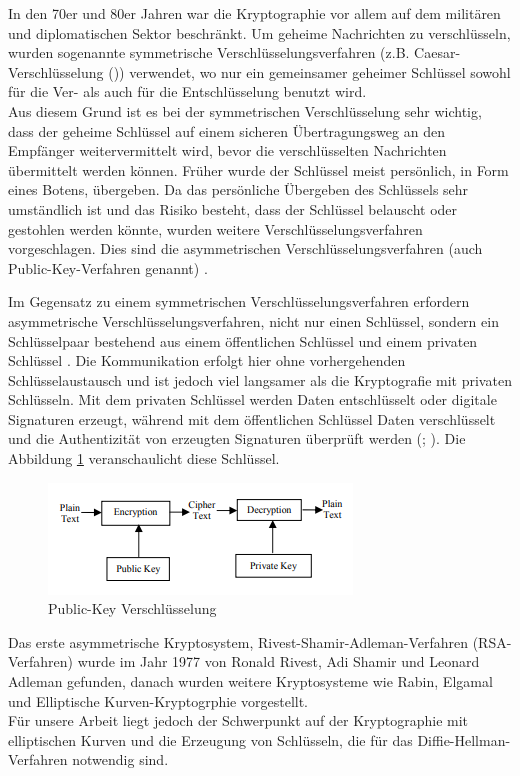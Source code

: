 In den 70er und 80er Jahren war die Kryptographie vor allem auf dem militären und diplomatischen Sektor beschränkt. Um geheime Nachrichten zu verschlüsseln, wurden sogenannte symmetrische Verschlüsselungsverfahren (z.B. Caesar-Verschlüsselung (\cite{moVarol})) verwendet, wo nur ein gemeinsamer geheimer Schlüssel sowohl für die Ver- als auch für die Entschlüsselung benutzt wird.\\

Aus diesem Grund ist es bei der symmetrischen Verschlüsselung sehr wichtig, dass der geheime Schlüssel auf einem sicheren Übertragungsweg an den Empfänger weitervermittelt wird, bevor die verschlüsselten Nachrichten übermittelt werden können. Früher wurde der Schlüssel meist persönlich, in Form eines Botens, übergeben. 
Da das persönliche Übergeben des Schlüssels sehr umständlich ist und das Risiko besteht, dass der Schlüssel belauscht oder gestohlen werden könnte, wurden weitere Verschlüsselungsverfahren vorgeschlagen. Dies sind die asymmetrischen Verschlüsselungsverfahren (auch Public-Key-Verfahren genannt) \cite{werner}. 

Im Gegensatz zu einem symmetrischen Verschlüsselungsverfahren erfordern asymmetrische Verschlüsselungsverfahren, nicht nur einen Schlüssel, sondern ein Schlüsselpaar bestehend aus einem öffentlichen Schlüssel und einem privaten Schlüssel \cite{damer}. Die Kommunikation erfolgt hier ohne vorhergehenden Schlüsselaustausch und ist jedoch viel langsamer als die Kryptografie mit privaten Schlüsseln. Mit dem privaten Schlüssel werden Daten entschlüsselt oder digitale Signaturen erzeugt, während mit dem öffentlichen Schlüssel Daten verschlüsselt und die Authentizität von erzeugten Signaturen überprüft  werden (\cite{sahuMa}; \cite{damer}). Die Abbildung \ref{key} veranschaulicht diese Schlüssel. 

\begin{figure}[!htb]
    \centering
    \includegraphics[width = 0.5 \textwidth]{Graphics/Fig1Encryption.png}
    \caption{Public-Key Verschlüsselung}
    \label{key}
\end{figure}


Das erste asymmetrische Kryptosystem, Rivest-Shamir-Adleman-Verfahren (RSA-Verfahren) wurde im Jahr 1977 von Ronald Rivest, Adi Shamir und Leonard Adleman gefunden, 
danach wurden weitere Kryptosysteme wie Rabin, Elgamal und Elliptische Kurven-Kryptogrphie vorgestellt.\\
Für unsere Arbeit liegt jedoch der Schwerpunkt auf der Kryptographie mit elliptischen Kurven und die Erzeugung von Schlüsseln, die für das Diffie-Hellman-Verfahren notwendig sind.\\

